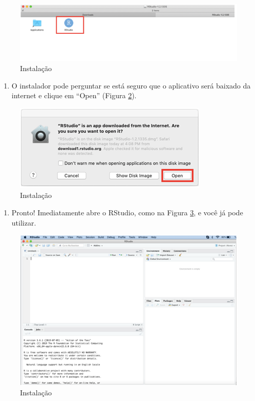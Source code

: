 \documentclass[
]{book}
\providecommand{\tightlist}{%
  \setlength{\itemsep}{0pt}\setlength{\parskip}{0pt}}
\begin{document}
\begin{figure}
\includegraphics[width=1\linewidth]{figures/mac_RSt_3} \caption{\label{fig:rsmac4} Instalação}\label{fig:rsmac4}
\end{figure}

\begin{enumerate}
\def\labelenumi{\arabic{enumi})}
\setcounter{enumi}{4}
\tightlist
\item
  O instalador pode perguntar se está seguro que o aplicativo será baixado da internet e clique em ``Open'' (Figura \ref{fig:rsmac5}).
\end{enumerate}

\begin{figure}
\includegraphics[width=1\linewidth]{figures/mac_RSt_4} \caption{\label{fig:rsmac5} Instalação}\label{fig:rsmac5}
\end{figure}

\begin{enumerate}
\def\labelenumi{\arabic{enumi})}
\setcounter{enumi}{5}
\tightlist
\item
  Pronto! Imediatamente abre o RStudio, como na Figura \ref{fig:rsmac6}, e você já pode utilizar.
\end{enumerate}

\begin{figure}
\includegraphics[width=1\linewidth]{figures/mac_RSt_5} \caption{\label{fig:rsmac6} Instalação}\label{fig:rsmac6}
\end{figure}
\end{document}
